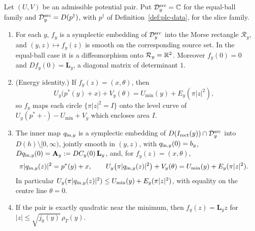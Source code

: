 \begin{theorem}\label{I:thm:pln-inner}
Let $(U,V)$ be an admissible potential pair. Put $\mathcal D_y^{\rm src}=\mathbb{C}$ for the equal-ball family and
$\mathcal D_y^{\rm src}=D(p^\dagger)$, with $p^\dagger$ of Definition~\ref{def:plc-data}, for the slice family.
\begin{enumerate}[label=(\alph*)]
\item For each $y$, $f_y$ is a symplectic embedding of $\mathcal D_y^{\rm src}$ into the Morse rectangle
 $\mathcal R_y$, and $(y,z)\mapsto f_y(z)$ is smooth on the corresponding source set. In the equal-ball case it is a diffeomorphism onto $\mathcal R_y=\mathbb{R}^2$. Moreover
 $f_y(0)=0$ and $Df_y(0)=\mathbf L_y$, a diagonal matrix of determinant $1$.
\item (Energy identity.) If $f_y(z)=(x,\theta)$, then
 \[
  U_y\bigl(p^*(y)+x\bigr)+V_y(\theta)=U_{\min}(y)+E_y(\pi|z|^2),
 \]
 so $f_y$ maps each circle $\{\pi|z|^2=I\}$ onto the level curve of $U_y(p^*+\cdot)-U_{\min}+V_y$ which encloses area $I$.
\item The inner map $q_{{\rm in},y}$ is a symplectic embedding of $D(I_{\rm rect}(y))\cap\mathcal D_y^{\rm src}$ into
 $D(h)\setminus[0,\infty)$, jointly smooth in $(y,z)$, with $q_{{\rm in},y}(0)=b_y$,
 $Dq_{{\rm in},y}(0)=\mathbf A_y:=DC_y(0)\,\mathbf L_y$, and, for $f_y(z)=(x,\theta)$,
 \[
  \pi|q_{{\rm in},y}(z)|^2=p^*(y)+x,\qquad
  U_y\bigl(\pi|q_{{\rm in},y}(z)|^2\bigr)+V_y(\theta)=U_{\min}(y)+E_y(\pi|z|^2).
 \]
 In particular $U_y(\pi|q_{{\rm in},y}(z)|^2)\le U_{\min}(y)+E_y(\pi|z|^2)$, with equality on the centre line $\theta=0$.
\item If the pair is exactly quadratic near the minimum, then $f_y(z)=\mathbf L_yz$ for
 $|z|\le\sqrt{j_0(y)}\,\rho_T(y)$.
\end{enumerate}
\end{theorem}

